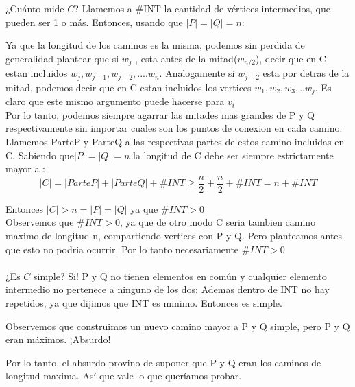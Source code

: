 \documentclass{article}
\begin{document}
¿Cuánto mide $C$? Llamemos a \#INT la cantidad de vértices intermedios, que pueden ser 1 o más. Entonces, usando que $|P| = |Q| = n$:

Ya que la longitud de los caminos es la misma, podemos sin perdida de generalidad plantear  que si $w_j$ , esta antes de la mitad($w_{n/2}$), decir  que en C estan incluidos $w_j,w_{j+1},w_{j+2},.... w_n$. Analogamente si $w_{j-2}$ esta por detras de la mitad, podemos decir que en C estan incluidos los vertices $w_{1},w_{2},w_{3},.. w_{j}.$ Es claro que este mismo argumento puede hacerse para $v_i$\\

Por lo tanto, podemos siempre agarrar las mitades mas grandes de P y Q respectivamente sin importar cuales son los puntos de conexion en cada camino. Llamemos ParteP y ParteQ a las respectivas partes de estos camino incluidas en C. Sabiendo que$|P| = |Q| = n$ la longitud de C debe ser siempre estrictamente mayor a :\\
        \[|C| =  |ParteP| + |ParteQ| + \#INT  \ge \frac{n}{2}  + \frac{n}{2} + \#INT  = n + \#INT\] 

Entonces $|C| > n = |P| = |Q|$ ya que  $ \#INT > 0$\\

Observemos que  $\#INT > 0$, ya que de otro modo C seria tambien camino maximo de longitud n, compartiendo  vertices con P y Q. Pero planteamos antes que esto no podria ocurrir. Por lo tanto necesariamente $\#INT > 0$\\ \\
¿Es $C$ simple? Si! P y Q no tienen elementos en común y cualquier elemento intermedio no pertenece a ninguno de los dos: Ademas dentro de INT no hay repetidos, ya que dijimos que INT es minimo. Entonces es simple.

Observemos que  construimos un nuevo camino mayor a P y Q simple, pero P y Q eran máximos. ¡Absurdo!

Por lo tanto, el absurdo provino de suponer que P y Q eran los caminos de longitud maxima. Así que vale lo que queríamos probar.
\end{document}
